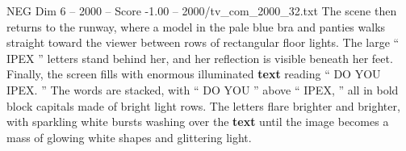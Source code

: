 \begin{textsample}{NEG Dim 6 – 2000 – Score -1.00 – 2000/tv\_com\_2000\_32.txt}
The scene then returns to the runway, where a model in the pale blue bra and panties walks straight toward the viewer between rows of rectangular floor lights.
The large “ IPEX ” letters stand behind her, and her reflection is visible beneath her feet.
Finally, the screen fills with enormous illuminated \textbf{text} reading “ DO YOU IPEX. ” The words are stacked, with “ DO YOU ” above “ IPEX, ” all in bold block capitals made of bright light rows.
The letters flare brighter and brighter, with sparkling white bursts washing over the \textbf{text} until the image becomes a mass of glowing white shapes and glittering light.

\end{textsample}

